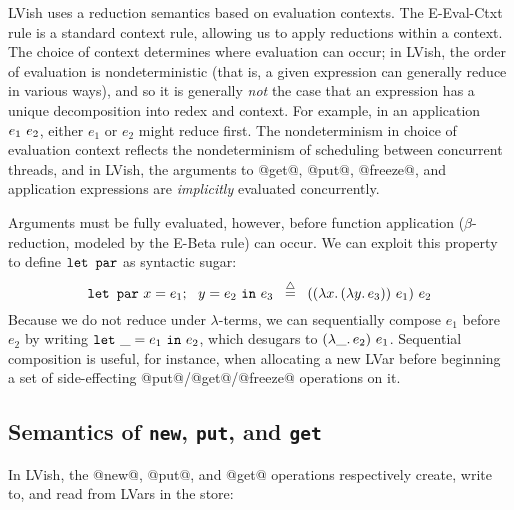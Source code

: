 LVish uses a reduction semantics based on evaluation contexts.  The
{\sc E-Eval-Ctxt} rule is a standard context rule, allowing us to
apply reductions within a context.  The choice of context determines
where evaluation can occur; in LVish, the order of evaluation is
nondeterministic (that is, a given expression can generally reduce in
various ways), and so it is generally \emph{not} the case that an
expression has a unique decomposition into redex and context.  For
example, in an application $e_1~e_2$, either $e_1$ or $e_2$
might reduce first.  The nondeterminism in choice of evaluation
context reflects the nondeterminism of scheduling between concurrent
threads, and in LVish, the arguments to @get@, @put@, @freeze@, and
application expressions are \emph{implicitly} evaluated concurrently.

Arguments must be fully evaluated, however, before function
application ($\beta$-reduction, modeled by the {\sc E-Beta} rule) can
occur.  We can exploit this property to define $\mbox{\texttt{\mbox{\texttt{let}}~\mbox{\texttt{par}}}}$ as syntactic
sugar:
\[
\mbox{\texttt{\mbox{\texttt{let}}~\mbox{\texttt{par}}}} ~x = e_1;~~y = e_2~\mbox{\texttt{in}}~e_3 \;\;\stackrel{\triangle}{=}\;\;
((\lambda x.\,(\lambda y.\,e_3))~e_1)~e_2
\]
Because we do not reduce under $\lambda$-terms, we can sequentially
compose $e_1$ before $e_2$ by writing $\mbox{\texttt{let}}~\_=e_1~\mbox{\texttt{in}}~e_2$, which
desugars to $(\lambda\_.\,e_2)~e_1$.  Sequential composition is
useful, for instance, when allocating a new LVar before beginning a
set of side-effecting @put@/@get@/@freeze@ operations on it.

\subsection{Semantics of \lstinline|new|, \lstinline|put|, and \lstinline|get|}\label{subsection:newputget}

In LVish, the @new@, @put@, and @get@ operations respectively
create, write to, and read from LVars in the store:

